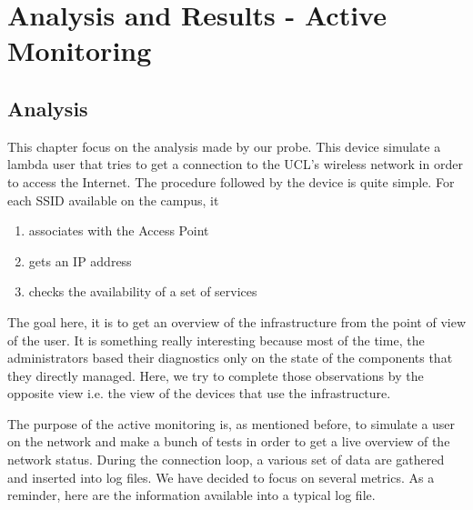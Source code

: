 
\chapter{Analysis and Results - Active Monitoring} %

\label{Chapter6} %





\section{Analysis}
This chapter focus on the analysis made by our probe. This device simulate a lambda user that tries to get a connection to the UCL's wireless network in order to access the Internet. The procedure followed by the device is quite simple. For each SSID available on the campus, it

\begin{enumerate}
\item associates with the Access Point
\item gets an IP address
\item checks the availability of a set of services
\end{enumerate}

The goal here, it is to get an overview of the infrastructure from the point of view of the user. It is something really interesting because most of the time, the administrators based their diagnostics only on the state of the components that they directly managed. Here, we try to complete those observations by the opposite view i.e. the view of the devices that use the infrastructure.

The purpose of the active monitoring is, as mentioned before, to simulate a user on the network and make a bunch of tests in order to get a live overview of the network status. During the connection loop, a various set of data are gathered and inserted into log files. We have decided to focus on several metrics. As a reminder, here are the information available into a typical log file.

